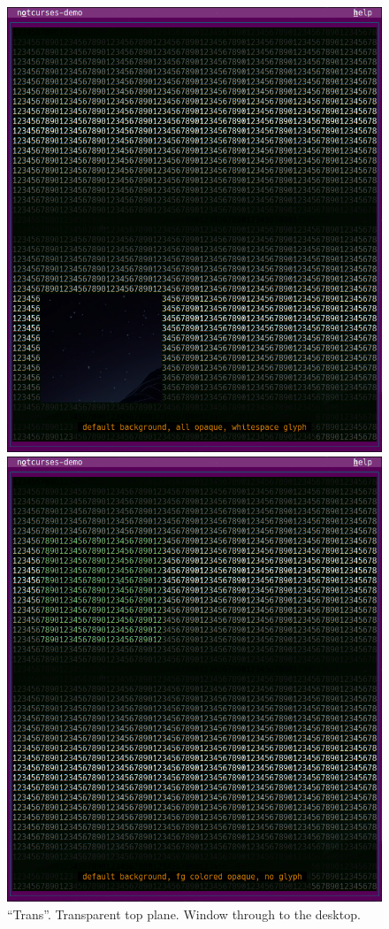 \documentclass[letterpaper,10pt]{article}
\begin{document}
\begin{figure}
  \centering
  \begin{minipage}{0.30\textwidth}
    \includegraphics[width=1\linewidth]{media/demo-trans1.png}
    \caption[``Trans'', early phase.]{``Trans''. Transparent top plane. Window through to the desktop.}
  \end{minipage}\hfill
  \begin{minipage}{0.30\textwidth}
    \includegraphics[width=1\linewidth]{media/demo-trans2.png}

\end{minipage}
\end{figure}
\end{document}
